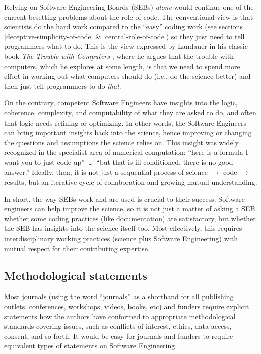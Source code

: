 \documentclass{comjnl}
\begin{document}
Relying on Software Engineering Boards (SEBs) \emph{alone\/} would continue one of the current besetting problems about the role of code. The conventional view is that scientists do the hard work compared to the ``easy'' coding work (see sections \ref{deceptive-simplicity-of-code} \& \ref{central-role-of-code}) so they just need to tell programmers what to do. This is the view expressed by Landauer in his classic book \emph{The Trouble with Computers\/} \cite{landauer,thimbleby-landauer}, where he argues that the trouble with computers, which he explores at some length, is that we need to spend more effort in working out what computers should do (i.e., do the science better) and then just tell programmers to do \emph{that}.  

On the contrary, competent Software Engineers have insights into the logic, coherence, complexity, and computability of what they are asked to do, and often that logic needs refining or optimizing. In other words, the Software Engineers can bring important insights back into the science, hence improving or changing the questions and assumptions the science relies on. This insight was widely recognized in the specialist area of numerical computation: ``here is a formula I want you to just code up''~\ldots\ ``but that is ill-conditioned, there is no good answer.'' Ideally, then, it is not just a sequential process of science $\rightarrow$ code $\rightarrow$ results, but an iterative cycle of collaboration and growing mutual understanding.

In short, the way SEBs work and are used is crucial to their success. Software engineers can help improve the science, so it is not just a matter of asking a SEB  whether some coding practices (like documentation) are satisfactory, but whether the SEB has insights into the science itself too. Most effectively, this requires interdisciplinary working practices (science plus Software Engineering) with mutual respect for their contributing expertise.

\subsection{Methodological statements}
Most journals (using the word ``journals'' as a shorthand for all publishing outlets, conferences, workshops, videos, books, etc) and funders require explicit statements how the authors have conformed to appropriate methodological standards covering issues, such as conflicts of interest, ethics, data access, consent, and so forth. It would be easy for journals and funders to require equivalent types of statements on Software Engineering.
\end{document}
